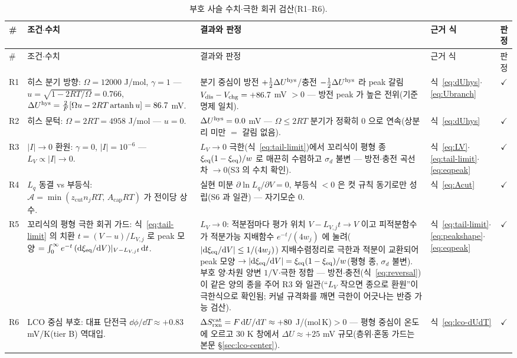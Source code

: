 \begin{longtable}{@{}l p{6.2cm} p{5.0cm} p{2.2cm} c@{}}
\caption{부호 사슬 수치$\cdot$극한 회귀 검산(R1--R6).}\label{tab:signcheck-R}\\
\toprule
\# & 조건$\cdot$수치 & 결과와 판정 & 근거 식 & 판정 \\
\midrule
\endfirsthead
\toprule
\# & 조건$\cdot$수치 & 결과와 판정 & 근거 식 & 판정 \\
\midrule
\endhead
R1 & 히스 분기 방향: $\Omega=12000$ J/mol, $\gamma=1$ ---
$u=\sqrt{1-2RT/\Omega}=0.766$, $\Delta U^{\mathrm{hys}}=\frac{2}{F}[\Omega u-2RT\,\mathrm{artanh}\,u]=86.7$ mV.
& 분기 중심이 방전 $+\tfrac12\Delta U^{\mathrm{hys}}$/충전 $-\tfrac12\Delta U^{\mathrm{hys}}$ 라 peak 갈림
$V_{\mathrm{dis}}-V_{\mathrm{chg}}=+86.7$ mV $>0$ --- 방전 peak 가 높은 전위(기준 명제 일치).
& 식~\eqref{eq:dUhys}$\cdot$ \eqref{eq:Ubranch} & $\checkmark$ \\
R2 & 히스 문턱: $\Omega=2RT=4958$ J/mol --- $u=0$.
& $\Delta U^{\mathrm{hys}}=0.0$ mV --- $\Omega\le2RT$ 분기가 정확히 $0$ 으로 연속(상분리 미만 $=$ 갈림 없음).
& 식~\eqref{eq:dUhys} & $\checkmark$ \\
R3 & $|I|\!\to\!0$ 환원: $\gamma=0$, $|I|=10^{-6}$ --- $L_V\propto|I|\to0$.
& $L_V\to0$ 극한(식~\eqref{eq:tail-limit})에서 꼬리식이 평형 종 $\xi_{\mathrm{eq}}(1-\xi_{\mathrm{eq}})/w$ 로 매끈히 수렴하고 $\sigma_d$ 불변 ---
방전$\cdot$충전 곡선 차 $\to0$(S3 의 수치 확인).
& 식~\eqref{eq:LV}$\cdot$ \eqref{eq:tail-limit}$\cdot$\eqref{eq:eqpeak} & $\checkmark$ \\
R4 & $L_q$ 동결 vs 부등식: $\mathcal A=\min(z_\mathrm{cut}n_jRT,\,A_\mathrm{cap}RT)$ 가 전이당 상수.
& 실현 미분 $\partial\ln L_q/\partial V=0$, 부등식 $<0$ 은 컷 규칙 동기로만 성립(S6 과 일관) ---
자기모순 $0$. & 식~\eqref{eq:Acut} & $\checkmark$ \\
R5 & 꼬리식의 평형 극한 회귀 가드: 식~\eqref{eq:tail-limit} 의 치환 $t=(V-u)/L_{V,j}$ 로
peak 모양 $=\int_0^\infty e^{-t}\,(\mathrm{d}\xi_{\mathrm{eq}}/\mathrm{d} V)|_{V-L_{V,j}t}\,\mathrm{d} t$.
& $L_V\to0$: 적분점마다 평가 위치 $V-L_{V,j}t\to V$ 이고 피적분함수가 적분가능 지배함수 $e^{-t}/(4w_j)$ 에
눌려($|\mathrm{d}\xi_{\mathrm{eq}}/\mathrm{d} V|\le1/(4w_j)$) 지배수렴정리로 극한과 적분이 교환되어 peak 모양
$\to|\mathrm{d}\xi_{\mathrm{eq}}/\mathrm{d} V|=\xi_{\mathrm{eq}}(1-\xi_{\mathrm{eq}})/w$(평형 종, $\sigma_d$ 불변). 부호 양$\cdot$차원 양변 $1/$V$\cdot$극한 정합
--- 방전$\cdot$충전(식~\eqref{eq:reversal})이 같은 양의 종을 주어 R3 와 일관(``$L_V$ 작으면 종으로 환원''이
극한식으로 확인됨; 커널 규격화를 깨면 극한이 어긋나는 반증 가능 검산).
& 식~\eqref{eq:tail-limit}$\cdot$ \eqref{eq:peakshape}$\cdot$ \eqref{eq:eqpeak} & $\checkmark$ \\
R6 & LCO 중심 부호: 대표 단전극 $\dd\phi/\dd T\approx+0.83$ mV/K(tier B)\cite{swiderska2019} 역대입.
& $\Delta S_{\mathrm{rxn}}^\mathrm{cat}=F\,\mathrm{d} U/\mathrm{d} T\approx+80$ J/(mol\,K)$>0$ --- 평형 중심이 온도에 오르고
$30$ K 창에서 $\Delta U\approx+25$ mV 규모(층위$\cdot$혼동 가드는 본문 \S\ref{sec:lco-center}).
& 식~\eqref{eq:lco-dUdT} & $\checkmark$ \\
\bottomrule
\end{longtable}


